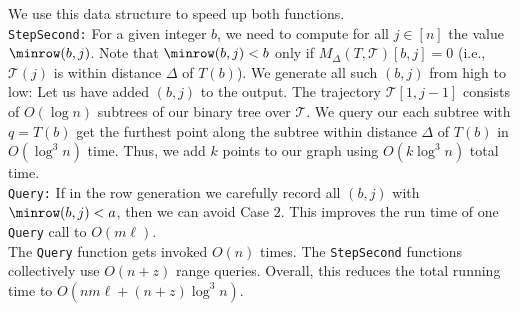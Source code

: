 %
\noindent     
We use this data structure to speed up both functions.  \\
%
%
%
%
%
    \texttt{StepSecond:} 
    For a given integer $b$, we need to compute for all $j \in [n]$ the value $\minrow(b, j)$. 
    Note that $\minrow(b, j) < b$ only if $M_\Delta(T, \mathcal{T})[b, j] = 0$ (i.e., $\mathcal{T}(j)$ is within distance $\Delta$ of $T(b)$).   
    We generate all such $(b, j)$ from high to low: 
    Let us have added $(b, j)$ to the output. 
    The trajectory $\mathcal{T}[1, j - 1]$ consists of $O(\log n)$ subtrees of our binary tree over $\mathcal{T}$. We query our each subtree with $q = T(b)$ get the furthest point along the subtree  within distance $\Delta$ of $T(b)$ in $O(\log^3 n)$ time. Thus, we add $k$ points to our graph using $O(k \log^3 n)$ total time.  \\
%
    \texttt{Query:} 
    If in the row generation we carefully record all $(b, j)$ with $\minrow(b, j) < a$, then we can avoid Case $2$. This improves the run time of one \texttt{Query} call to $O(m \ell)$. \\
%
%
\noindent   
    The \texttt{Query} function gets invoked $O(n)$ times. The \texttt{StepSecond} functions collectively use $O(n + z)$ range queries. 
    Overall, this reduces the total running time to $O( n m \ell + (n+z) \log^3 n)$.
%
%
%
%
